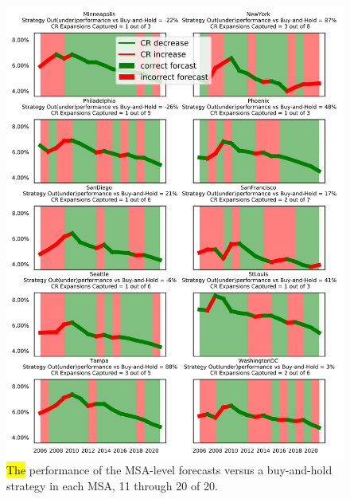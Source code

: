 \documentclass[jrfm,article,accept,oneauthor,pdftex]{Definitions/mdpi}
\begin{document}
\begin{figure}[H]
\includegraphics[scale=.9]{Definitions/mas_graph_11_20.jpg}
\caption{\hl{The} %
 performance of the MSA-level forecasts versus a buy-and-hold strategy in each MSA, 11 through 20 of 20.\label{fig1}}
\end{figure}  %
\end{document}
